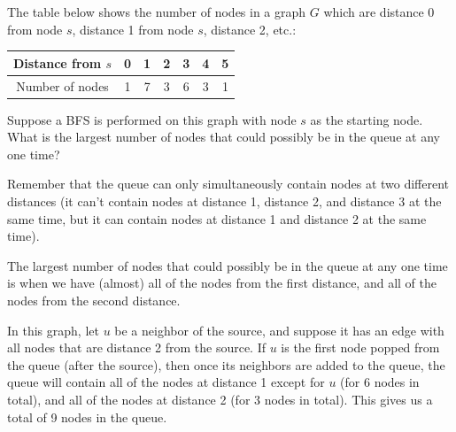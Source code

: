 \begin{prob}

    The table below shows the number of nodes in a graph $G$ which are distance 0
    from node $s$, distance 1 from node $s$, distance 2, etc.:

    \begin{center} 
        \begin{tabular}{c|cccccc}\toprule
            Distance from $s$ & 0 & 1 & 2 & 3 & 4 & 5 \\ \midrule
            Number of nodes   & 1 & 7 & 3 & 6 & 3 & 1 \\ \bottomrule
        \end{tabular}
    \end{center}

    Suppose a BFS is performed on this graph with node $s$ as the starting node.
    What is the largest number of nodes that could possibly be in the queue at any one time?


    \begin{soln}
        Remember that the queue can only simultaneously contain nodes at two different
        distances (it can't contain nodes at distance 1, distance 2, and distance 3
        at the same time, but it can contain nodes at distance 1 and distance 2 at the
        same time).

        The largest number of nodes that could possibly be in the queue at any one time
        is when we have (almost) all of the nodes from the first distance, and all
        of the nodes from the second distance.

        In this graph, let $u$ be a neighbor of the source, and suppose it has
        an edge with all nodes that are distance 2 from the source. If $u$ is
        the first node popped from the queue (after the source), then once its
        neighbors are added to the queue, the queue will contain all of the
        nodes at distance 1 except for $u$ (for 6 nodes in total), and all of
        the nodes at distance 2 (for 3 nodes in total). This gives us a total
        of 9 nodes in the queue.
    \end{soln}

\end{prob}
